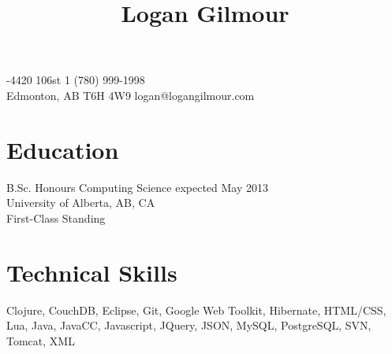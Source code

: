 \documentclass[10pt]{article}
\title{\bfseries\Large Logan Gilmour}
\author{}
\date{}
\begin{document}
\maketitle
{}-4420 106st \hfill 1 (780) 999-1998\\
Edmonton, AB  T6H 4W9 \hfill logan@logangilmour.com
\section*{Education}
B.Sc. Honours Computing Science expected May 2013\\
University of Alberta, AB, CA\\
First-Class Standing


\section*{Technical Skills}
Clojure, CouchDB, Eclipse, Git, Google Web Toolkit, Hibernate, HTML/CSS, Lua, Java, JavaCC, Javascript, JQuery, JSON, MySQL, PostgreSQL, SVN, Tomcat, XML



\end{document}
